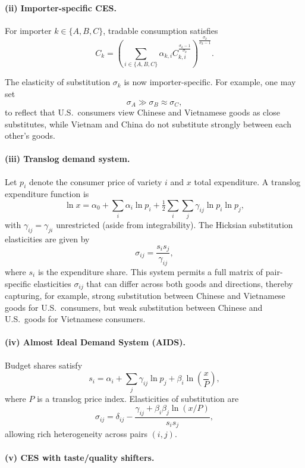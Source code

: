 \documentclass[11pt]{article}
\begin{document}
\paragraph{(ii) Importer-specific CES.}

For importer $k \in \{A,B,C\}$, tradable consumption satisfies
\[
C_k
=
\left(
  \sum_{i \in \{A,B,C\}}
    \alpha_{k,i}
    C_{k,i}^{\frac{\sigma_k - 1}{\sigma_k}}
\right)^{\frac{\sigma_k}{\sigma_k - 1}}.
\]

The elasticity of substitution $\sigma_k$ is now importer-specific.
For example, one may set
\[
\sigma_A \gg \sigma_B \approx \sigma_C,
\]
to reflect that U.S.\ consumers view Chinese and Vietnamese goods as close
substitutes, while Vietnam and China do not substitute strongly between
each other's goods.

\paragraph{(iii) Translog demand system.}

Let $p_i$ denote the consumer price of variety $i$ and $x$ total
expenditure. A translog expenditure function is
\[
\ln x
=
\alpha_0
+
\sum_i \alpha_i \ln p_i
+
\tfrac{1}{2}
\sum_i \sum_j \gamma_{ij} \ln p_i \ln p_j,
\]
with $\gamma_{ij} = \gamma_{ji}$ unrestricted (aside from integrability).
The Hicksian substitution elasticities are given by
\[
\sigma_{ij}
=
\frac{s_i s_j}{\gamma_{ij}},
\]
where $s_i$ is the expenditure share. This system permits a full matrix of
pair-specific elasticities $\sigma_{ij}$ that can differ across both goods
and directions, thereby capturing, for example, strong substitution
between Chinese and Vietnamese goods for U.S.\ consumers, but weak
substitution between Chinese and U.S.\ goods for Vietnamese consumers.

\paragraph{(iv) Almost Ideal Demand System (AIDS).}

Budget shares satisfy
\[
s_i
=
\alpha_i
+
\sum_j \gamma_{ij} \ln p_j
+
\beta_i \ln\!\left(\frac{x}{P}\right),
\]
where $P$ is a translog price index.
Elasticities of substitution are
\[
\sigma_{ij}
=
\delta_{ij}
-
\frac{\gamma_{ij} + \beta_i \beta_j \ln(x/P)}
      {s_i s_j},
\]
allowing rich heterogeneity across pairs $(i,j)$.

\paragraph{(v) CES with taste/quality shifters.}
\end{document}
